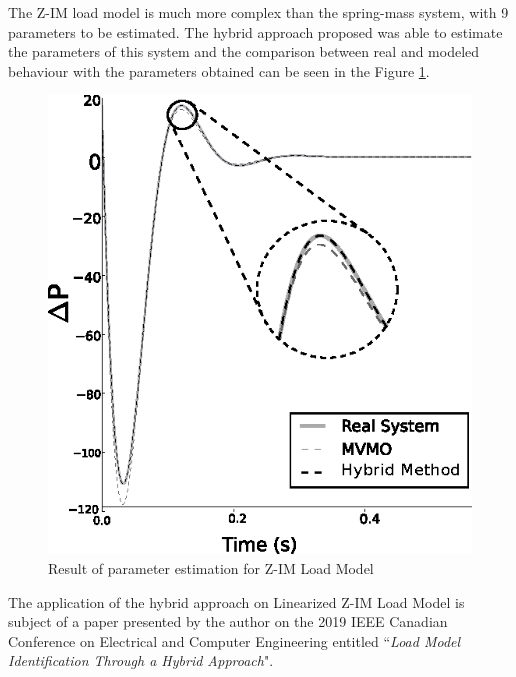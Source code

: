 The Z-IM load model is much more complex than the spring-mass system, with 9 parameters to be estimated. The hybrid approach proposed was able to estimate the parameters of this system and the comparison between real and modeled behaviour with the parameters obtained can be seen in the Figure \ref{fig: ZIM}.

\begin{figure}[h]
	\caption{Result of parameter estimation for Z-IM Load Model}
	\begin{center}
		\includegraphics[scale=1]{Images/ZIM.eps}
	\end{center}
	\label{fig: ZIM}
\end{figure}

The application of the hybrid approach on Linearized Z-IM Load Model is subject of a paper presented by the author on the 2019 IEEE Canadian Conference on Electrical and Computer Engineering entitled ``\textit{Load Model Identification Through a Hybrid Approach}".
